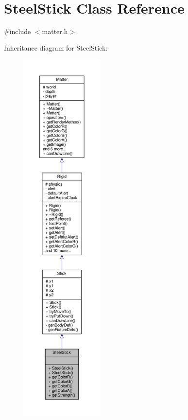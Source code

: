 \hypertarget{classSteelStick}{}\section{Steel\+Stick Class Reference}
\label{classSteelStick}


{\ttfamily \#include $<$matter.\+h$>$}



Inheritance diagram for Steel\+Stick\+:
\nopagebreak
\begin{figure}[H]
\begin{center}
\leavevmode
\includegraphics[height=550pt]{classSteelStick__inherit__graph}
\end{center}
\end{figure}


